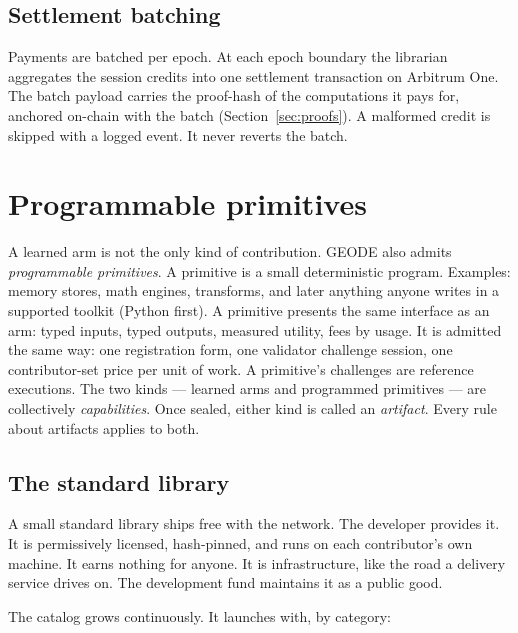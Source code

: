 \documentclass[11pt]{article}
\begin{document}
\subsection{Settlement batching}

Payments are batched per epoch. At each epoch boundary the
librarian aggregates the session credits into one settlement
transaction on Arbitrum One. The batch payload carries the
proof-hash of the computations it pays for, anchored on-chain
with the batch (Section~\ref{sec:proofs}). A malformed credit is
skipped with a logged event. It never reverts the batch.

\section{Programmable primitives}

A learned arm is not the only kind of contribution. GEODE also
admits \emph{programmable primitives}. A primitive is a small
deterministic program. Examples: memory stores, math engines,
transforms, and later anything anyone writes in a supported
toolkit (Python first). A primitive presents the same interface
as an arm: typed inputs, typed outputs, measured utility, fees by
usage. It is admitted the same way: one registration form, one
validator challenge session, one contributor-set price per unit
of work. A primitive's challenges are reference executions. The
two kinds --- learned arms and programmed primitives --- are
collectively \emph{capabilities}. Once sealed, either kind is
called an \emph{artifact}. Every rule about artifacts applies to
both.

\subsection{The standard library}

A small standard library ships free with the network. The
developer provides it. It is permissively licensed, hash-pinned,
and runs on each contributor's own machine. It earns nothing for
anyone. It is infrastructure, like the road a delivery service
drives on. The development fund maintains it as a public good.

The catalog grows continuously. It launches with, by category:
\end{document}
